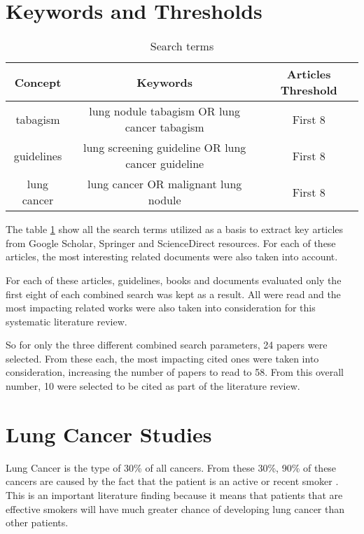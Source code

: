 \label{chap:literature_review}

\section{Keywords and Thresholds}
\begin{center}
\begin{table}

  \begin{tabular}{c|c|c}
    \hline 
    Concept & Keywords & Articles Threshold\tabularnewline
    \hline 
    tabagism & lung nodule tabagism OR lung cancer tabagism & First 8\tabularnewline
    guidelines & lung screening guideline OR lung cancer guideline & First 8\tabularnewline
    lung cancer & lung cancer OR malignant lung nodule & First 8\tabularnewline
    \hline 
  \end{tabular}
\par
\caption{\label{table:search_terms} Search terms}
\end{table}
  \vspace*{-44pt}
\end{center}

The table \ref{table:search_terms} show all the search terms utilized as a basis to extract key articles from Google Scholar, Springer  and ScienceDirect resources. For each of these articles, the most interesting related documents were also taken into account.

For each of these articles, guidelines, books and documents evaluated only the first eight of each combined search was kept as a result. All were read and the most impacting related works were also taken into consideration for this systematic literature review.

So for only the three different combined search parameters, 24 papers were selected. From these each, the  most impacting cited ones were taken into consideration, increasing the number of papers to  read to 58. From this overall number, 10 were selected to be cited as part of the literature review. %

\section{Lung Cancer Studies}

Lung Cancer is the type of 30\% of all cancers. From these 30\%, 90\% of these cancers are  caused by the fact that the patient is an active or recent smoker \cite{jaklitsch2012}\cite{nccn2019}\cite{roberts2013}. This is an important literature finding because it means that patients that are effective smokers will have much greater chance of developing lung cancer than other patients.

